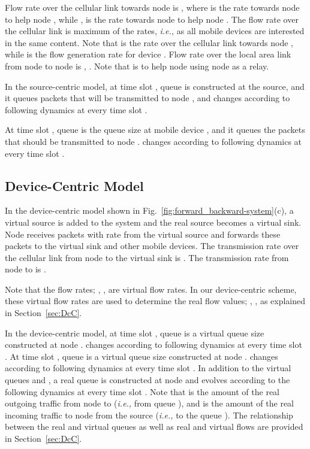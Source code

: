 \documentclass[conference]{IEEEtran}
\newcommand{\ie}{{\em i.e., }}
\begin{document}
Flow rate over the cellular link towards node  is , where  is the rate towards node  to help node , while ,  is the rate towards node  to help node . The flow rate over the cellular link is maximum of the rates, \ie   as all mobile devices are interested in the same content. Note that  is the rate over the cellular link towards node , while  is the flow generation rate for device . Flow rate over the local area link from node  to node  is , . Note that  is to help node  using node  as a relay.

In the source-centric model, at time slot , queue  is constructed at the source, and it queues packets that will be transmitted to node , and changes according to following dynamics at every time slot .

At time slot , queue  is the queue size at mobile device , and it queues the packets that should be transmitted to node .  changes according to following dynamics at every time slot .


\subsection{Device-Centric Model}
In the device-centric model shown in Fig.~\ref{fig:forward_backward-system}(c), a virtual source is added to the system and the real source becomes a virtual sink. Node  receives packets with rate  from the virtual source and forwards these packets to the virtual sink and other mobile devices. The transmission rate over the cellular link from node  to the virtual sink is . The transmission rate from node  to  is .

Note that the flow rates; , ,  are virtual flow rates. In our device-centric scheme, these virtual flow rates are used to determine the real flow values; , ,  as explained in Section~\ref{sec:DcC}.

In the device-centric model, at time slot , queue  is a virtual queue size constructed at node .  changes according to following dynamics at every time slot .
 At time slot , queue  is a virtual queue size constructed at node .  changes according to following dynamics at every time slot .
 In addition to the virtual queues  and , a real queue  is constructed at node  and evolves according to the following dynamics at every time slot .
 Note that  is the amount of the real outgoing traffic from node  to  (\ie from queue ), and  is the amount of the real incoming traffic to node  from the source (\ie to the queue ). The relationship between the real and virtual queues as well as real and virtual flows are provided in Section~\ref{sec:DcC}.
\end{document}
